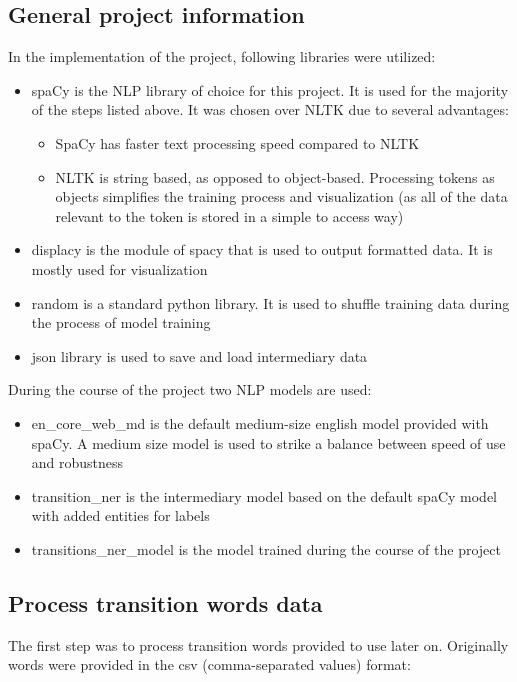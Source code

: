 \subsection{General project information}
In the implementation of the project, following libraries were utilized:
\begin{itemize}
    \item spaCy is the NLP library of choice for this project. It is used for the majority of the steps listed above. It was chosen over NLTK due to several advantages:
    \begin{itemize}
        \item SpaCy has faster text processing speed compared to NLTK
        \item NLTK is string based, as opposed to object-based. Processing tokens as objects simplifies the training process and visualization (as all of the data relevant to the token is stored in a simple to access way)
    \end{itemize}
    \item displacy is the module of spacy that is used to output formatted data. It is mostly used for visualization
    \item random is a standard python library. It is used to shuffle training data during the process of model training
    \item json library is used to save and load intermediary data
\end{itemize}

During the course of the project two NLP models are used:
\begin{itemize}
    \item en\_core\_web\_md is the default medium-size english model provided with spaCy. A medium size model is used to strike a balance between speed of use and robustness
    \item transition\_ner is the intermediary model based on the default spaCy model with added entities for labels
    \item transitions\_ner\_model is the model trained during the course of the project
\end{itemize}

\subsection{Process transition words data}
The first step was to process transition words provided to use later on. Originally words were provided in the csv (comma-separated values) format:


